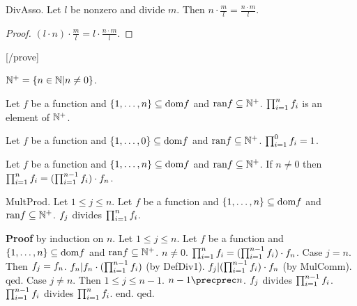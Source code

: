 \begin{lemma} DivAsso.
Let $l$ be nonzero and divide $m$.
Then $n \cdot \frac{m}{l} = \frac{n \cdot m}{l}$.\end{lemma}
\begin{proof}
$(l \cdot n) \cdot \frac{m}{l} = l \cdot \frac{n \cdot m}{l}$.
\end{proof}

[/prove]

\begin{definitionp}
$\NNplus = \{n \in \NN | n \neq 0 \}$.
\end{definitionp}

\begin{signaturep}  
Let $f$ be a function and $\Seq{n} \subseteq \text{dom} f$
and $\text{ran} f \subseteq \NNplus$.
$\Product{f}{n}$ is an element of $\NNplus$.
\end{signaturep}

\begin{axiomp} Let $f$ be a function and $\Seq{0} \subseteq \text{dom} f$
and $\text{ran} f \subseteq \NNplus$.
$\Product{f}{0}=1$.
\end{axiomp}

\begin{axiomp} Let $f$ be a function and $\Seq{n} \subseteq \text{dom} f$
and $\text{ran} f \subseteq \NNplus$.
If $n \neq 0$ then 
$\Product{f}{n}=(\Product{f}{n-1})\cdot \subfunc{f}{n}$.
\end{axiomp}

\begin{lemma} MultProd.
Let $1 \leq j \leq n$. Let $f$ be a function and 
$\Seq{n} \subseteq \text{dom} f$ and $\text{ran} f \subseteq \NNplus$.
$\subfunc{f}{j}$ divides $\Product{f}{n}$.
\end{lemma}
{\bf Proof} by induction on $n$.
Let $1 \leq j \leq n$. Let $f$ be a function and 
$\Seq{n} \subseteq \text{dom} f$ and $\text{ran} f \subseteq \NNplus$.
$n \neq 0$.
$\Product{f}{n}=(\Product{f}{n-1})\cdot \subfunc{f}{n}$.
Case $j = n$. 
Then $\subfunc{f}{j} = \subfunc{f}{n}$.
$\subfunc{f}{n} |
\subfunc{f}{n} \cdot (\Product{f}{n-1})$ (by DefDiv1).
$\subfunc{f}{j} |(\Product{f}{n-1}) \cdot \subfunc{f}{n}$ (by MulComm). 
qed.
Case $j \neq n$. 
Then $1 \leq j \leq n-1$. 
$n-1 \precprec n$. 
$\subfunc{f}{j}$ divides $\Product{f}{n-1}$.
$\Product{f}{n-1}$ divides $\Product{f}{n}$.
end.
qed.


